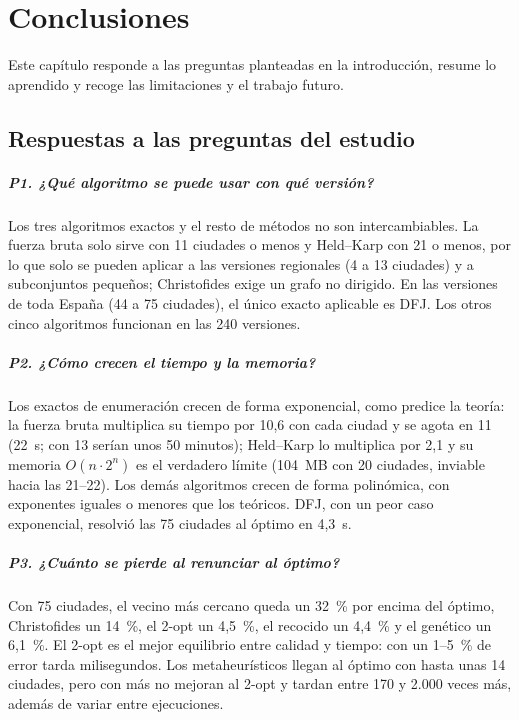 \chapter{Conclusiones}\label{cap:conclusiones}

Este capítulo responde a las preguntas planteadas en la introducción, resume lo aprendido y recoge las limitaciones y el trabajo futuro.

\section{Respuestas a las preguntas del estudio}

\paragraph{P1. ¿Qué algoritmo se puede usar con qué versión?} Los tres algoritmos exactos y el resto de métodos no son intercambiables. La fuerza bruta solo sirve con 11 ciudades o menos y Held--Karp con 21 o menos, por lo que solo se pueden aplicar a las versiones regionales (4 a 13 ciudades)
y a subconjuntos pequeños; Christofides exige un grafo no dirigido. En las versiones de toda España (44 a 75 ciudades), el único exacto aplicable es DFJ. Los otros cinco algoritmos funcionan en las 240 versiones.

\paragraph{P2. ¿Cómo crecen el tiempo y la memoria?} Los exactos de enumeración crecen de forma exponencial, como predice la teoría: la fuerza bruta multiplica su tiempo por 10,6 con cada ciudad y se agota en 11 (22~s; con 13 serían unos 50 minutos); Held--Karp lo multiplica por 2,1 y su memoria $O(n\cdot 2^n)$ es el verdadero límite
(104~MB con 20 ciudades, inviable hacia las 21--22). Los demás algoritmos crecen de forma polinómica, con exponentes iguales o menores que los teóricos. DFJ, con un peor caso exponencial, resolvió las 75 ciudades al óptimo en 4,3~s.

\paragraph{P3. ¿Cuánto se pierde al renunciar al óptimo?} Con 75 ciudades, el vecino más cercano queda un 32~\% por encima del óptimo, Christofides un 14~\%, el 2-opt un 4,5~\%, el recocido un 4,4~\% y el genético un 6,1~\%. El 2-opt es el mejor equilibrio entre calidad y tiempo: con un 1--5~\% de error tarda milisegundos.
Los metaheurísticos llegan al óptimo con hasta unas 14 ciudades, pero con más no mejoran al 2-opt y tardan entre 170 y 2.000 veces más, además de variar entre ejecuciones.

